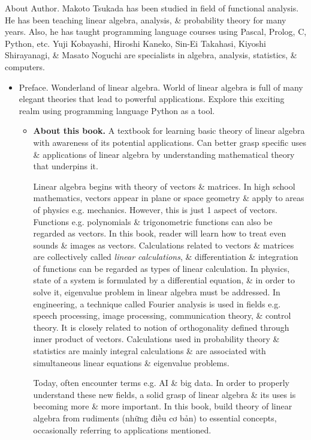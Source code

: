 \documentclass{article}
\begin{document}
{\sf About Author.} {\sc Makoto Tsukada} has been studied in field of functional analysis. He has been teaching linear algebra, analysis, \& probability theory for many years. Also, he has taught programming language courses using Pascal, Prolog, C, Python, etc. {\sc Yuji Kobayashi, Hiroshi Kaneko, Sin-Ei Takahasi, Kiyoshi Shirayanagi, \& Masato Noguchi} are specialists in algebra, analysis, statistics, \& computers.
\begin{itemize}
	\item {\sf Preface.} Wonderland of linear algebra. World of linear algebra is full of many elegant theories that lead to powerful applications. Explore this exciting realm using programming language Python as a tool.
	\begin{itemize}
		\item {\bf About this book.} A textbook for learning basic theory of linear algebra with awareness of its potential applications. Can better grasp specific uses \& applications of linear algebra by understanding mathematical theory that underpins it.
		
		Linear algebra begins with theory of vectors \& matrices. In high school mathematics, vectors appear in plane or space geometry \& apply to areas of physics e.g. mechanics. However, this is just 1 aspect of vectors. Functions e.g. polynomials \& trigonometric functions can also be regarded as vectors. In this book, reader will learn how to treat even sounds \& images as vectors. Calculations related to vectors \& matrices are collectively called {\it linear calculations}, \& differentiation \& integration of functions can be regarded as types of linear calculation. In physics, state of a system is formulated by a differential equation, \& in order to solve it, eigenvalue problem in linear algebra must be addressed. In engineering, a technique called Fourier analysis is used in fields e.g. speech processing, image processing, communication theory, \& control theory. It is closely related to notion of orthogonality defined through inner product of vectors. Calculations used in probability theory \& statistics are mainly integral calculations \& are associated with simultaneous linear equations \& eigenvalue problems.
		
		Today, often encounter terms e.g. AI \& big data. In order to properly understand these new fields, a solid grasp of linear algebra \& its uses is becoming more \& more important. In this book, build theory of linear algebra from rudiments (những điều cơ bản) to essential concepts, occasionally referring to applications mentioned.
		

\end{itemize}
\end{itemize}
\end{document}
